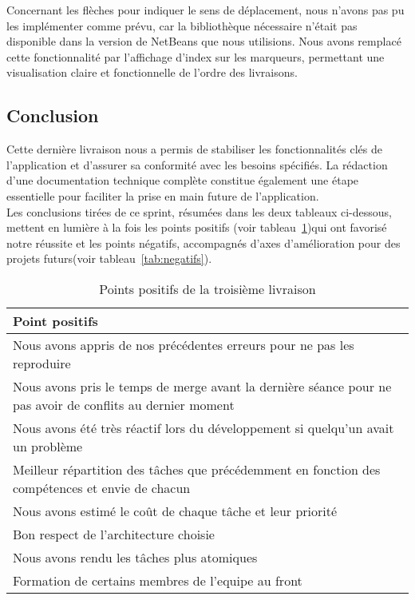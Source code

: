 \documentclass[a4paper]{article}
\begin{document}
Concernant les flèches pour indiquer le sens de déplacement, nous n'avons pas pu les implémenter comme prévu, car la bibliothèque nécessaire n'était pas disponible dans la version de NetBeans que nous utilisions. Nous avons remplacé cette fonctionnalité par l'affichage d'index sur les marqueurs, permettant une visualisation claire et fonctionnelle de l'ordre des livraisons.

\subsection{Conclusion}
Cette dernière livraison nous a permis de stabiliser les fonctionnalités clés de l'application et d'assurer sa conformité avec les besoins spécifiés. La rédaction d'une documentation technique complète constitue également une étape essentielle pour faciliter la prise en main future de l'application.\\
\newline
Les conclusions tirées de ce sprint, résumées dans les deux tableaux ci-dessous, mettent en lumière à la fois les points positifs (voir tableau~\ref{tab:positifs})qui ont favorisé notre réussite et les points négatifs, accompagnés d'axes d'amélioration pour des projets futurs(voir tableau~\ref{tab:negatifs}).
    \begin{table}[H]
    \centering
    \begin{tabularx}{\textwidth}{|X|}
    \hline
    \textbf{Point positifs} \\ \hline
    Nous avons appris de nos précédentes erreurs pour ne pas les reproduire \\ \hline
    Nous avons pris le temps de merge avant la dernière séance pour ne pas avoir de conflits au dernier moment \\ \hline
    Nous avons été très réactif lors du développement si quelqu'un avait un problème \\ \hline
    Meilleur répartition des tâches que précédemment en fonction des compétences et envie de chacun \\ \hline
    Nous avons estimé le coût de chaque tâche et leur priorité \\ \hline
    Bon respect de l'architecture choisie \\ \hline
    Nous avons rendu les tâches plus atomiques \\ \hline
    Formation de certains membres de l'equipe au front\\ \hline
    \end{tabularx}
    \caption{Points positifs de la troisième livraison}
    \label{tab:positifs}
    \end{table}
\end{document}
